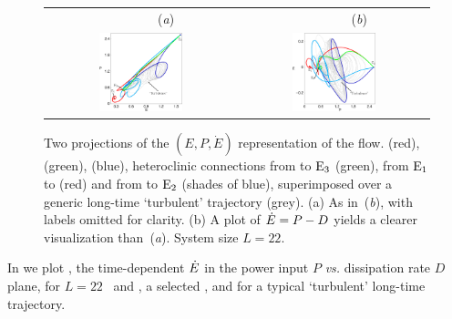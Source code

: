 \begin{figure}[t]
\begin{center}
 \begin{tabular}{cc}
        ~~~~~~~~(\textit{a})                        &   ~~~~~~~~(\textit{b}) \\
    \includegraphics[width=0.46\textwidth, clip=true]{figs/connEP_pst.eps}     & \includegraphics[width=0.46\textwidth, clip=true]{figs/connPEdot_pst.eps}
 \end{tabular}
\end{center}
\caption{
Two projections of the $(E,P,\dot{E})$ representation of the flow.
 (red),  (green),  (blue),
heteroclinic connections from  to $\mathrm{E}_{3}$ (green),
from $\mathrm{E}_{1}$ to  (red)
and from  to $\mathrm{E}_{2}$ (shades of blue), superimposed over
a generic long-time `turbulent' trajectory (grey).
(a) As in \,(\textit{b}),
with labels omitted for clarity.
(b) A plot of  $\dot{E} = P - D$ yields a clearer
visualization than \,(\textit{a}).
System size $L=22$.
        }
\label{f:drivedragConn}
\end{figure}

In  we plot , the time-dependent
$\dot{E}$ in the power input $P$ {\em vs.}
dissipation rate $D$ plane, for $L=22$ \eqva\ and \reqva,
a selected \rpo, and for a typical `turbulent' long-time
trajectory.

